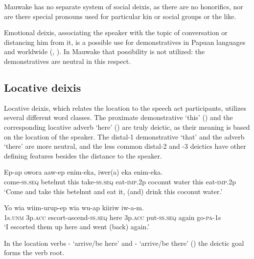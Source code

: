 Mauwake has no separate system of social deixis, as there are no honorifics, nor are there special pronouns used for particular kin or social groups or the like.

Emotional deixis, associating the speaker with the topic of conversation or distancing him from it, is a possible use for demonstratives in Papuan languages and worldwide (\citealt[72--78]{FarrEtAl1982}, \citealt[347--355]{Lakoff1974}). In Mauwake that possibility is not utilized: the demonstratives are neutral in this respect.

\subsection{Locative deixis} \label{sec:6.3.2}

Locative deixis, which relates the location to the speech act participants, utilizes several different word classes. The proximate demonstrative  `this'  () and the corresponding locative adverb  `here'  ()  are truly deictic, as their meaning is based on the location of the speaker. The distal-1 demonstrative  `that' and the adverb  `there' are more neutral, and the less common distal-2 and -3 deictics have other defining features besides the distance to the speaker. 

\ea%
\label{ex:6:x1273}
\gll Ep-ap  owora    aaw-ep  enim-eka,  iwer(a)  eka   enim-eka. \\
come-\textsc{ss}.\textsc{seq}  betelnut  this  take-\textsc{ss}.\textsc{seq}  eat-\textsc{imp}.2p  coconut  water this  eat-\textsc{imp}.2p\\
\glt `Come and take this betelnut and eat it, (and) drink this coconut water.'
\z

\ea%
\label{ex:6:x1274}
\gll Yo  wia  wiim-urup-ep    wia  wu-ap kiiriw  iw-a-m.\\
1s.\textsc{unm}  3p.\textsc{acc}  escort-ascend-\textsc{ss}.\textsc{seq}  here  3p.\textsc{acc}  put-\textsc{ss}.\textsc{seq} again  go-\textsc{pa}-1s\\
\glt `I escorted them up here and went (back) again.'
\z

In the location verbs - `arrive/be here'  and - `arrive/be there' () the deictic goal forms the verb root. 

